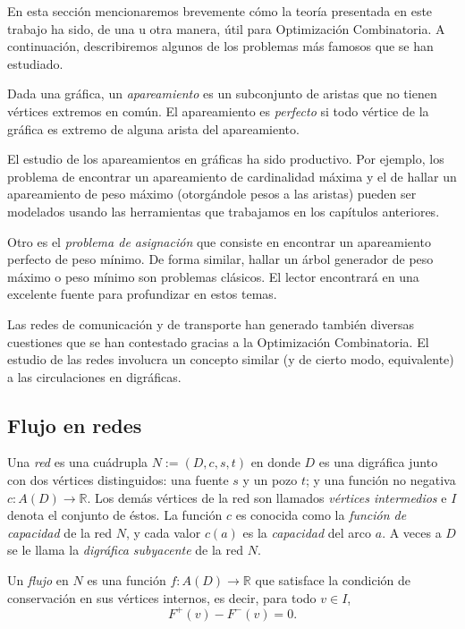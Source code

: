 En esta sección mencionaremos brevemente cómo la teoría presentada en este trabajo ha sido, de una u otra manera, útil para Optimización Combinatoria. A continuación, describiremos algunos de los problemas más famosos que se han estudiado.

Dada una gráfica, un \textit{apareamiento} es un subconjunto de aristas que no tienen vértices extremos en común. El apareamiento es \textit{perfecto} si todo vértice de la gráfica es extremo de alguna arista del apareamiento.

El estudio de los apareamientos en gráficas ha sido productivo. Por ejemplo, los problema de encontrar un apareamiento de cardinalidad máxima y el de hallar un apareamiento de peso máximo (otorgándole pesos a las aristas) pueden ser modelados usando las herramientas que trabajamos en los capítulos anteriores. 

Otro es el \textit{problema de asignación} que consiste en encontrar un apareamiento perfecto de peso mínimo. De forma similar, hallar un árbol generador de peso máximo o peso mínimo son problemas clásicos. El lector encontrará en \cite{Korte} una excelente fuente para profundizar en estos temas.

Las redes de comunicación y de transporte han generado también diversas cuestiones que se han contestado gracias a la Optimización Combinatoria. El estudio de las redes involucra un concepto similar (y de cierto modo, equivalente) a las circulaciones en digráficas.

\subsection{Flujo en redes}
Una \textit{red} es una cuádrupla $N:=(D,c,s,t)$ en donde $D$ es una digráfica junto con dos vértices distinguidos: una fuente $s$ y un pozo $t$; y una función no negativa $c\colon A(D) \rightarrow \mathbb{R}$. Los demás vértices de la red son llamados \textit{vértices intermedios} e $I$ denota el conjunto de éstos. La función $c$ es conocida como la \textit{función de capacidad} de la red $N$, y cada valor $c(a)$ es la \textit{capacidad} del arco $a$. A veces a $D$ se le llama la \textit{digráfica subyacente} de la red $N$.

Un \textit{flujo} en $N$ es una función $f\colon A(D) \rightarrow \mathbb{R}$ que satisface la condición de conservación en sus vértices internos, es decir, para todo $v \in I$,$$ F^{+}(v) - F^{-}(v) = 0.$$

